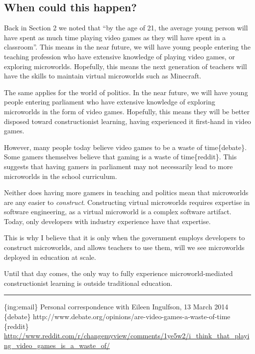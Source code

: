 \subsection{When could this happen?}

Back in Section 2 we noted that ``by the age of 21, the average young
person will have spent as much time playing video games as they will
have spent in a classroom''. This means in the near future, we will have
young people entering the teaching profession who have extensive
knowledge of playing video games, or exploring microworlds. Hopefully,
this means the next generation of teachers will have the skills to
maintain virtual microworlds such as Minecraft.

The same applies for the world of politics. In the near future, we will
have young people entering parliament who have extensive knowledge of
exploring microworlds in the form of video games. Hopefully, this means
they will be better disposed toward constructionist learning, having
experienced it first-hand in video games.

However, many people today believe video games to be a waste of
time\{debate\}. Some gamers themselves believe that gaming is a waste of
time\{reddit\}. This suggests that having gamers in parliament may not
necessarily lead to more microworlds in the school curriculum.

Neither does having more gamers in teaching and politics mean that
microworlds are any easier to \emph{construct}. Constructing virtual
microworlds requires expertise in software engineering, as a virtual
microworld is a complex software artifact. Today, only developers with
industry experience have that expertise.

This is why I believe that it is only when the government employs
developers to construct microworlds, and allows teachers to use them,
will we see microworlds deployed in education at scale.

Until that day comes, the only way to fully experience
microworld-mediated constructionist learning is outside traditional
education.

\begin{center}\rule{3in}{0.4pt}\end{center}

\{ing:email\} Personal correspondence with Eileen Ingulfson, 13 March
2014 \{debate\}
http://www.debate.org/opinions/are-video-games-a-waste-of-time
\{reddit\}
\href{\%5D}{http://www.reddit.com/r/changemyview/comments/1ye5w2/i\_think\_that\_playing\_video\_games\_is\_a\_waste\_of/}

